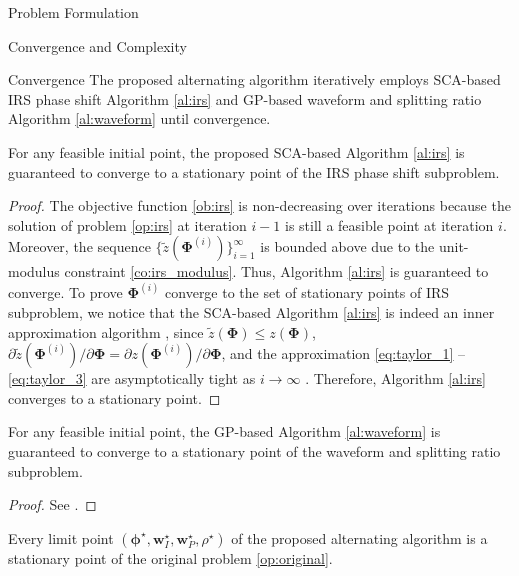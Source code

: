 \documentclass{IEEEtran}
\begin{document}
\begin{section}{Problem Formulation}
	\begin{subsection}{Convergence and Complexity}
		\begin{subsubsection}{Convergence}
			The proposed alternating algorithm iteratively employs SCA-based IRS phase shift Algorithm \ref{al:irs} and GP-based waveform and splitting ratio Algorithm \ref{al:waveform} until convergence.

			\begin{proposition}\label{pr:irs}
				For any feasible initial point, the proposed SCA-based Algorithm \ref{al:irs} is guaranteed to converge to a stationary point of the IRS phase shift subproblem.
			\end{proposition}

			\begin{proof}\label{pf:irs}
				The objective function \ref{ob:irs} is non-decreasing over iterations because the solution of problem \ref{op:irs} at iteration $i-1$ is still a feasible point at iteration $i$. Moreover, the sequence $\{\tilde{z}(\boldsymbol{\Phi}^{(i)})\}_{i=1}^{\infty}$ is bounded above due to the unit-modulus constraint \ref{co:irs_modulus}. Thus, Algorithm \ref{al:irs} is guaranteed to converge. To prove $\boldsymbol{\Phi}^{(i)}$ converge to the set of stationary points of IRS subproblem, we notice that the SCA-based Algorithm \ref{al:irs} is indeed an inner approximation algorithm \cite{Marks1978}, since $\tilde{z}(\boldsymbol{\Phi}) \le z(\boldsymbol{\Phi})$, $\partial\tilde{z}(\boldsymbol{\Phi}^{(i)})/\partial\boldsymbol{\Phi}=\partial z(\boldsymbol{\Phi}^{(i)})/\partial\boldsymbol{\Phi}$, and the approximation \ref{eq:taylor_1} -- \ref{eq:taylor_3} are asymptotically tight as $i \to \infty$ \cite{Adali2010,Li2013}. Therefore, Algorithm \ref{al:irs} converges to a stationary point.
			\end{proof}

			\begin{proposition}\label{pr:waveform}
				For any feasible initial point, the GP-based Algorithm \ref{al:waveform} is guaranteed to converge to a stationary point of the waveform and splitting ratio subproblem.
			\end{proposition}

			\begin{proof}\label{pf:waveform}
				See \cite{Clerckx2016a,Clerckx2018b}.
			\end{proof}

			\begin{proposition}\label{pr:ao}
				Every limit point $(\boldsymbol{\phi}^{\star},\boldsymbol{w}_I^{\star},\boldsymbol{w}_P^{\star},\rho^{\star})$ of the proposed alternating algorithm is a stationary point of the original problem \ref{op:original}.
			\end{proposition}


\end{subsubsection}
\end{subsection}
\end{section}
\end{document}
